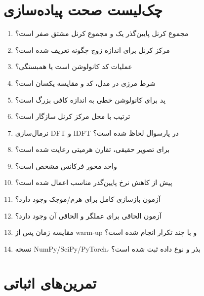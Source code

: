 \section{چک‌لیست صحت پیاده‌سازی}

\begin{enumerate}
\item مجموع کرنل پایین‌گذر یک و مجموع کرنل مشتق صفر است؟
\item مرکز کرنل برای اندازه زوج چگونه تعریف شده است؟
\item عملیات کد کانولوشن است یا همبستگی؟
\item شرط مرزی در مدل، کد و مقایسه یکسان است؟
\item پد برای کانولوشن خطی به اندازه کافی بزرگ است؟
\item ترتیب  با محل مرکز کرنل سازگار است؟
\item نرمال‌سازی DFT و IDFT در پارسوال لحاظ شده است؟
\item برای تصویر حقیقی، تقارن هرمیتی رعایت شده است؟
\item واحد محور فرکانس مشخص است؟
\item پیش از کاهش نرخ پایین‌گذر مناسب اعمال شده است؟
\item آزمون بازسازی کامل برای هرم/موجک وجود دارد؟
\item آزمون الحاقی برای عملگر و الحاقی آن وجود دارد؟
\item مقایسه زمان پس از warm-up و با چند تکرار انجام شده است؟
\item نسخه NumPy/SciPy/PyTorch، بذر و نوع داده ثبت شده است؟
\end{enumerate}

\section{تمرین‌های اثباتی}

